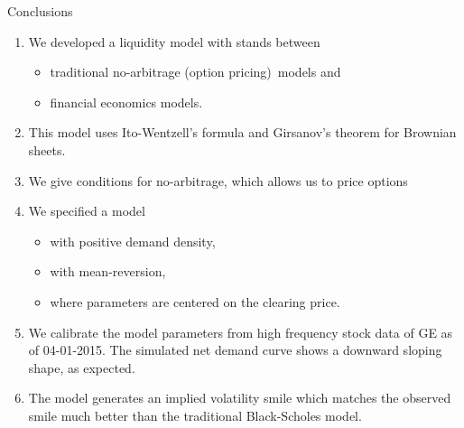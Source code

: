 \documentclass{beamer}
\begin{document}
\begin{frame}[shrink=25]{{\color{cyan}Conclusions}}
\bigskip
\begin{enumerate}
\item We developed a liquidity model with stands between
		\begin{itemize}
			\item traditional no-arbitrage (option pricing)\ models and
			\item financial economics models.
		\end{itemize}

\vspace{5pt}
\item This model uses Ito-Wentzell's formula and Girsanov's theorem for Brownian sheets.

\vspace{5pt}
\item We give conditions for no-arbitrage, which allows us to price options

\vspace{5pt}
\item We specified a model
		\begin{itemize}
			\item with positive demand density,
			\item with mean-reversion,
			\item where parameters are centered on the clearing price.
		\end{itemize}

\vspace{5pt}	
\item We calibrate the model parameters from high frequency stock data of GE as of 04-01-2015. The simulated net demand curve shows a downward sloping shape, as expected.

\vspace{5pt}	
\item The model generates an implied volatility smile which matches the observed smile much better than the traditional Black-Scholes model.
\end{enumerate}
\end{frame}
\end{document}
